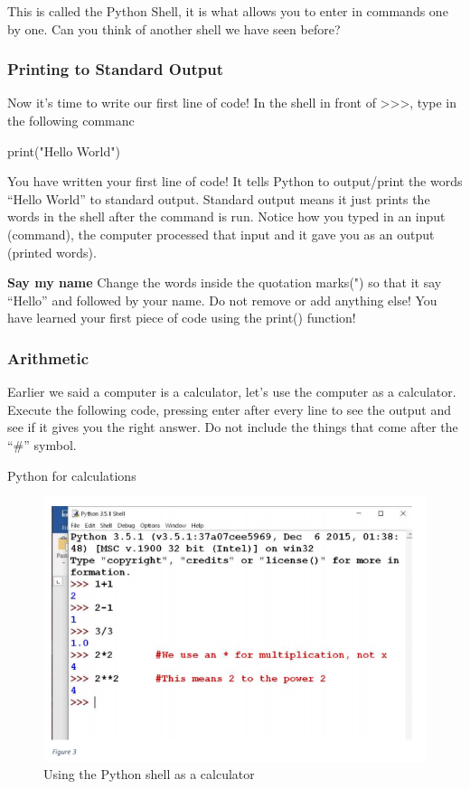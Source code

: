 This is called the Python Shell, it is what allows you to enter in commands one by one. Can you think of another shell we have seen before? 

\subsubsection{Printing to Standard Output}
Now it's time to write our first line of code! In the shell in front of {>}{>}>, type in the following commanc

\begin{shell}
print("Hello World") 
\end{shell}

You have written your first line of code! It tells Python to output/print the words “Hello World” to standard output. Standard output means it just prints the words in the shell after the command is run. Notice how you typed in an input (command), the computer processed that input and it gave you as an output (printed words).

\begin{exercise} \textbf{Say my name}
Change the words inside the quotation marks(") so that it say “Hello” and followed by your name.
Do not remove or add anything else! You have learned your first piece of code using the print()
function!
\end{exercise}

\subsubsection{Arithmetic}
Earlier we said a computer is a calculator, let’s use the computer as a calculator. Execute the
following code, pressing enter after every line to see the output and see if it gives you the right answer. Do not include the things that come after the
“\#” symbol.

\begin{example} Python for calculations
\begin{figure}[h]
\centering\includegraphics[scale=0.5]{Chapter_One/Figures/c.png}
\caption{Using the Python shell as a calculator}
\label{fig:cmd} 
\end{figure}
\end{example}

